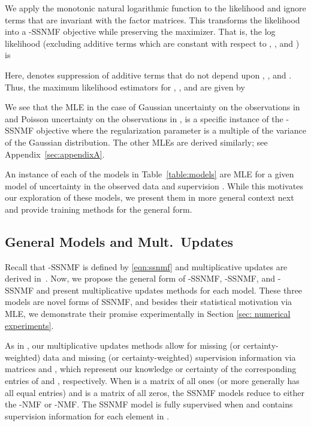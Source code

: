 \documentclass[twocolumn,10pt]{article}
\begin{document}
{\footnotesize }

\noindent We apply the monotonic natural logarithmic function to the likelihood and ignore terms that are invariant with the factor matrices.  This transforms the likelihood into a -SSNMF objective while preserving the maximizer.  That is, the log likelihood (excluding additive terms which are constant with respect to , , and ) is 

{\footnotesize }

\noindent Here,  denotes suppression of additive terms that do not depend upon , , and .  Thus, the maximum likelihood estimators for , , and  are given by  

We see that the MLE in the case of Gaussian uncertainty on the observations in  and Poisson uncertainty on the observations in , is a specific instance of the -SSNMF objective where the regularization parameter  is a multiple of the variance of the Gaussian distribution.
The other MLEs are derived similarly; see Appendix~\ref{sec:appendixA}.  

An instance of each of the models in Table~\ref{table:models} are MLE for a given model of uncertainty in the observed data  and supervision .  While this motivates our exploration of these models, we present them in more general context next and provide training methods for the general form.  



\subsection{General Models and Mult.\ Updates}\label{subsec:propmodels}
Recall that -SSNMF
is defined by \eqref{eqn:ssnmf} and multiplicative updates are derived in~\cite{lee2009semi}.  Now, we propose the general form of -SSNMF, -SSNMF, and -SSNMF and present multiplicative updates methods for each model. 
These three models are novel forms of SSNMF, and besides their statistical motivation via MLE, we demonstrate their promise experimentally in Section \ref{sec: numerical experiments}.

As in \cite{lee2009semi}, our multiplicative updates methods allow for missing (or certainty-weighted) data and missing (or certainty-weighted) supervision information via matrices  and , which represent our knowledge or certainty of the corresponding entries of  and , respectively.  When  is a matrix of all ones (or more generally has all equal entries) and  is a matrix of all zeros, the SSNMF models reduce to either the -NMF or -NMF. 
The SSNMF model is fully supervised when  and  contains supervision information for each element in .
\end{document}
